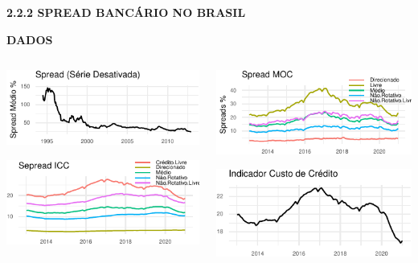 \documentclass[ignorenonframetext,aspectratio=169,ignorenonframetext]{beamer}
\begin{document}
\begin{frame}{\textbf{2.2.2 SPREAD BANCÁRIO NO BRASIL}}
\protect\hypertarget{spread-bancuxe1rio-no-brasil-1}{}

\textbf{DADOS}

\begin{columns}[T]
\begin{column}{0.5\textwidth}
\begin{center}\includegraphics{01-presentation-V1_files/figure-beamer/spread.m.1994.2012-1} \end{center}

\begin{center}\includegraphics{01-presentation-V1_files/figure-beamer/spread.icc-1} \end{center}
\end{column}

\begin{column}{0.5\textwidth}
\begin{center}\includegraphics{01-presentation-V1_files/figure-beamer/spread.moct-1} \end{center}

\begin{center}\includegraphics{01-presentation-V1_files/figure-beamer/icc-1} \end{center}
\end{column}
\end{columns}

\end{frame}
\end{document}
